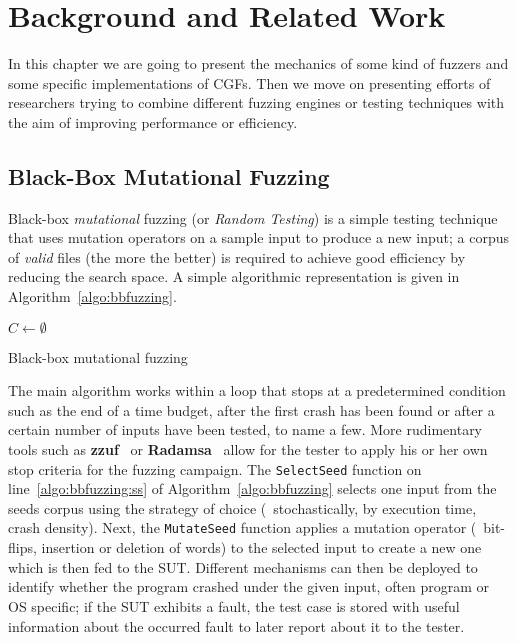\chapter{Background and Related Work}
\label{chap:related}

In this chapter we are going to present the mechanics of some kind of fuzzers
and some specific implementations of \acfp{CGF}. Then we move on presenting
efforts of researchers trying to combine different fuzzing engines or testing
techniques with the aim of improving performance or efficiency.

\section{Black-Box Mutational Fuzzing}
\label{sec:bbfuzz}
Black-box \emph{mutational} fuzzing (or \emph{Random Testing}) is a simple
testing technique that uses mutation operators on a sample input to produce a
new input; a corpus of \emph{valid} files (the more the better) is required to
achieve good efficiency by reducing the search space. A simple algorithmic
representation is given in Algorithm~\ref{algo:bbfuzzing}.

\begin{algorithm}
    \DontPrintSemicolon%
    \BlankLine%
    $C \leftarrow \emptyset$\;
    \caption{Black-box mutational fuzzing}
\label{algo:bbfuzzing}
\end{algorithm}

The main algorithm works within a loop that stops at a predetermined condition
such as the end of a time budget, after the first crash has been found or after
a certain number of inputs have been tested, to name a few. More rudimentary
tools such as \textbf{zzuf}~\cite{hocevar2011zzuf} or
\textbf{Radamsa}~\cite{helin2015radamsa} allow for the tester to apply his or
her own stop criteria for the fuzzing campaign. The \texttt{SelectSeed} function
on line~\ref{algo:bbfuzzing:ss} of Algorithm~\ref{algo:bbfuzzing} selects one
input from the seeds corpus using the strategy of choice (\eg~stochastically, by
execution time, crash density). Next, the \texttt{MutateSeed} function applies a
mutation operator (\eg~bit-flips, insertion or deletion of words) to the
selected input to create a new one which is then fed to the \ac{SUT}. Different
mechanisms can then be deployed to identify whether the program crashed under
the given input, often program or \ac{OS} specific; if the \ac{SUT} exhibits a
fault, the test case is stored with useful information about the occurred fault
to later report about it to the tester.

